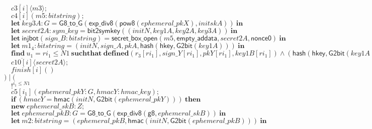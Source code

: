 \documentclass{article}
\newcommand{\cinput}[2]{{#1}({#2})}
\newcommand{\coutput}[2]{\overline{#1}\langle{#2}\rangle}
\newcommand{\kw}[1]{\mathbf{#1}}
\newcommand{\kwf}[1]{\mathsf{#1}}
\newcommand{\var}[1]{\mathit{#1}}
\newcommand{\kwt}[1]{\mathit{#1}}
\newcommand{\kwp}[1]{\mathit{#1}}
\newcommand{\kwc}[1]{\mathit{#1}}
\begin{document}
\begin{tabbing}
\>$\quad \coutput{\kwc{c3}[\var{i}]}{\var{m3}};$\\
\>$\quad \cinput{\kwc{c4}[\var{i}]}{\var{m5}: \kwt{bitstring}};$\\
\>$\quad \kw{let}\ \var{key3A}: \kwt{G} = \kwf{G8{\_}to{\_}G}(\kwf{exp{\_}div8}(\kwf{pow8}(\var{ephemeral{\_}pkX}), \var{initskA}))\ \kw{in}$\\
\>$\quad \kw{let}\ \var{secret2A}: \kwt{sym{\_}key} = \kwf{bit2symkey}(\kwf{}(\var{initN}, \var{key1A}, \var{key2A}, \var{key3A}))\ \kw{in}$\\
\>$\quad \kw{let}\ \kwf{injbot}(\var{sign{\_}B}: \kwt{bitstring}) = \kwf{secret{\_}box{\_}open}(\var{m5}, \kwf{empty{\_}addata}, \var{secret2A}, \kwf{nonce0})\ \kw{in}$\\
\>$\quad \kw{let}\ \var{m1}_{4}: \kwt{bitstring} = \kwf{}(\var{initN}, \var{sign{\_}A}, \var{pkA}, \kwf{hash}(\kwf{hkey}, \kwf{G2bit}(\var{key1A})))\ \kw{in}$\\
\>$\quad \kw{find}\ \var{u}_{1} = \var{ri}_{1} \leq \kwp{N1}\ \kw{suchthat}\ \kw{defined}(\var{r}_{3}[\var{ri}_{1}], \var{sign{\_}Y}[\var{ri}_{1}], \var{pkY}[\var{ri}_{1}], \var{key1B}[\var{ri}_{1}])\wedge (\kwf{hash}(\kwf{hkey}, \kwf{G2bit}(\var{key1A}))  =  \kwf{hash}(\kwf{hkey}, \kwf{G2bit}(\var{key1B}[\var{ri}_{1}]))) \wedge  (\var{pkA}  =  \var{pkY}[\var{ri}_{1}]) \wedge  (\var{sign{\_}A}  =  \var{sign{\_}Y}[\var{ri}_{1}]) \wedge  \kwf{check2}(\var{m1}_{4}, \kwf{pkgen2}(\var{initsignB}), \var{sign{\_}B})\ \kw{then}$\\
\>$\quad \coutput{\kwc{c10}[\var{i}]}{\var{secret2A}};$\\
\>$\quad \cinput{\kwc{finish}[\var{i}]}{}$\\
\>$) \mid ($\\
\>$\quad !^{\var{i}_{1} \leq \kwp{N1}}$\\
\>$\quad \cinput{\kwc{c5}[\var{i}_{1}]}{\var{ephemeral{\_}pkY}: \kwt{G}, \var{hmacY}: \kwt{hmac{\_}key}};$\\
\>$\quad \kw{if}\ (\var{hmacY}  =  \kwf{hmac}(\var{initN}, \kwf{G2bit}(\var{ephemeral{\_}pkY})))\ \kw{then}$\\
\>$\quad \kw{new}\ \var{ephemeral{\_}skB}: \kwt{Z};$\\
\>$\quad \kw{let}\ \var{ephemeral{\_}pkB}: \kwt{G} = \kwf{G8{\_}to{\_}G}(\kwf{exp{\_}div8}(\kwf{g8}, \var{ephemeral{\_}skB}))\ \kw{in}$\\
\>$\quad \kw{let}\ \var{m2}: \kwt{bitstring} = \kwf{}(\var{ephemeral{\_}pkB}, \kwf{hmac}(\var{initN}, \kwf{G2bit}(\var{ephemeral{\_}pkB})))\ \kw{in}$\\

\end{tabbing}
\end{document}
